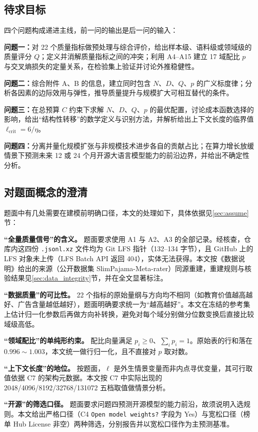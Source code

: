 \subsection{待求目标}

四个问题构成递进主线，前一问的输出是后一问的输入：

\textbf{问题一：}对 22 个质量指标做预处理与综合评价，给出样本级、语料级或领域级的质量评分 $Q$；定义并消解质量指标之间的冲突；利用 A4--A15 建立 17 域配比 $p$ 与交叉熵损失的定量关系，在检验集上验证并讨论外推稳健性。

\textbf{问题二：}综合附件 A、B 的信息，建立同时包含 $N$、$D$、$Q$、$p$ 的广义标度律；分析各因素的边际效用与弹性，推导质量提升与规模扩大可相互替代的条件。

\textbf{问题三：}在总预算 $C$ 约束下求解 $N$、$D$、$Q$、$p$ 的最优配置，讨论成本函数选择的影响，给出``结构性转移''的数学定义与识别方法，并解析给出上下文长度的临界值 $\ell_{\mathrm{crit}}=6/\eta$。

\textbf{问题四：}分离并量化规模扩张与非规模技术进步各自的贡献占比；在算力增长放缓情景下预测未来 12 或 24 个月开源大语言模型能力的前沿边界，并给出不确定性分析。

\subsection{对题面概念的澄清}

题面中有几处需要在建模前明确口径，本文的处理如下，具体依据见\ref{sec:assume}节：

\textbf{``全量质量信号''的含义。} 题面要求使用 A1 与 A2、A3 的全部记录。经核查，仓库内这四份 \texttt{.jsonl.xz} 文件均为 Git LFS 指针（132--134 字节），且 GitHub 上的 LFS 对象未上传（LFS Batch API 返回 404），实体无法获得。本文按《数据说明》给出的来源（公开数据集 SlimPajama-Meta-rater）同源重建，重建规则与核验结果见\ref{sec:data_integrity}节，并在全文显著标注。

\textbf{``数据质量''的可比性。} 22 个指标的原始量纲与方向均不相同（如教育价值越高越好、广告含量越低越好），题面明确要求统一为``越高越好''。本文在冻结的参考集上估计归一化参数后再做方向补转换，避免对每个域分别做分位数变换后直接比较域级高低。

\textbf{``领域配比''的单纯形约束。} 配比向量满足 $p_i\ge0$、$\sum_i p_i=1$。原始表的行和落在 $0.996\sim1.003$，本文统一做行归一化，且不直接对 $p$ 取对数。

\textbf{``上下文长度''的地位。} 按题面，$\ell$ 是外生情景变量而非内点寻优变量，其可行取值依据 C7 的架构元数据。本文按 C7 中实际出现的 2048/4096/8192/32768/131072 五档取值做情景分析。

\textbf{``开源''的筛选口径。} 题面要求问题四预测开源模型的能力前沿，故须说明入选规则。本文给出严格口径（C4 \texttt{Open model weights?} 字段为 Yes）与宽松口径（榜单 Hub License 非空）两种筛选，分别报告并以宽松口径作为主预测基准。
